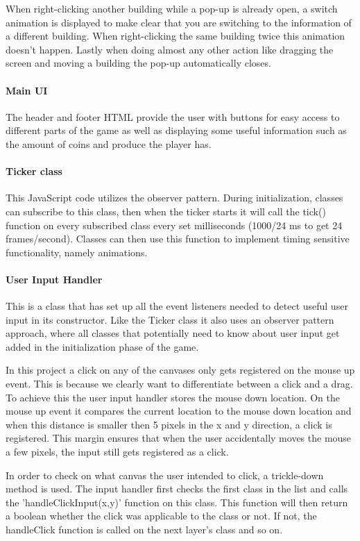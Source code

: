 \documentclass[12pt]{article}
\begin{document}
When right-clicking another building while a pop-up is already open, a switch animation is displayed to make clear that
you are switching to the information of a different building. When right-clicking the same building twice this animation
doesn't happen. Lastly when doing almost any other action like dragging the screen and moving a building the pop-up
automatically closes.

\paragraph{Main UI} The header and footer HTML provide the user with buttons for easy access to different parts of the
game as well as displaying some useful information such as the amount of coins and produce the player has.

\paragraph{Ticker class} This JavaScript code utilizes the observer pattern. During initialization, classes can
subscribe to this class, then when the  ticker starts it will call the tick() function on every subscribed class every
set milliseconds (1000/24 ms to get 24 frames/second). Classes can then use this function to implement timing sensitive
functionality, namely animations.

\paragraph{User Input Handler} This is a class that has set up all the event listeners needed to detect useful user
input in its constructor. Like the Ticker class it also uses an observer pattern approach, where all classes that
potentially need to know about user input get added in the initialization phase of the game.

In this project a click on any of the canvases only gets registered on the mouse up event. This is because we clearly
want to differentiate between a click and a drag. To achieve this the user input handler stores the mouse down location.
On the mouse up event it compares the current location to the mouse down location and when this distance is smaller then
5 pixels in the x and y direction, a click is registered. This margin ensures that when the user accidentally moves the
mouse a few pixels, the input still gets registered as a click.

In order to check on what canvas the user intended to click, a trickle-down method is used. The input handler first
checks the first class in the list and calls the 'handleClickInput(x,y)' function on this class. This function will then
return a boolean whether the click was applicable to the class or not. If not, the handleClick function is called on the
next layer's class and so on.
\end{document}
